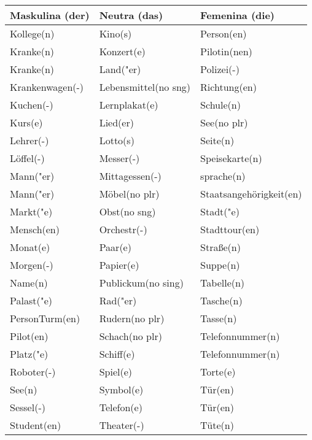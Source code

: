 \documentclass{article}
\renewcommand{\arraystretch}{1}
\begin{document}
\begin{table}[h!]
    \centering
    \renewcommand{\arraystretch}{1.5}
    \begin{tabular}{|>{\raggedright\arraybackslash}p{5cm}|>{\raggedright\arraybackslash}p{5cm}|>{\raggedright\arraybackslash}p{5cm}|}
        \hline
        \rowcolor{gray!20} \textbf{Maskulina (der)} & \textbf{Neutra (das)} & \textbf{Femenina (die)} \\
        \hline
        Kollege(n) & Kino(s) & Person(en) \\\hline
        Kranke(n) & Konzert(e) & Pilotin(nen) \\\hline
        Kranke(n) & Land("er) & Polizei(-) \\\hline
        Krankenwagen(-) & Lebensmittel(no sng) & Richtung(en) \\\hline
        Kuchen(-) & Lernplakat(e) & Schule(n) \\\hline
        Kurs(e) & Lied(er) & See(no plr) \\\hline
        Lehrer(-) & Lotto(s) & Seite(n) \\\hline
        Löffel(-) & Messer(-) & Speisekarte(n) \\\hline
        Mann("er) & Mittagessen(-) & sprache(n) \\\hline
        Mann("er) & Möbel(no plr) & Staatsangehörigkeit(en) \\\hline
        Markt("e) & Obst(no sng) & Stadt("e) \\\hline
        Mensch(en) & Orchestr(-) & Stadttour(en) \\\hline
        Monat(e) & Paar(e) & Stra\ss{}e(n) \\\hline
        Morgen(-) & Papier(e) & Suppe(n) \\\hline
        Name(n) & Publickum(no sing) & Tabelle(n) \\\hline
        Palast("e) & Rad("er) & Tasche(n) \\\hline
        PersonTurm(en) & Rudern(no plr) & Tasse(n) \\\hline
        Pilot(en) & Schach(no plr) & Telefonnummer(n) \\\hline
        Platz("e) & Schiff(e) & Telefonnummer(n) \\\hline
        Roboter(-) & Spiel(e) & Torte(e) \\\hline
        See(n) & Symbol(e) & Tür(en) \\\hline
        Sessel(-) & Telefon(e) & Tür(en) \\\hline
        Student(en) & Theater(-) & Tüte(n) \\\hline

\end{tabular}
\end{table}
\end{document}
